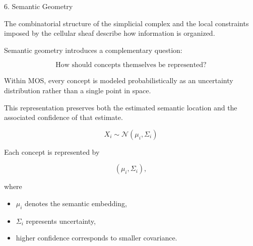 %
%

\begin{mosbox}{6. Semantic Geometry}

\BodyFont

The combinatorial structure of the simplicial complex and the local
constraints imposed by the cellular sheaf describe how information is
organized.

Semantic geometry introduces a complementary question:

\[
\boxed{
\text{How should concepts themselves be represented?}
}
\]

Within MOS, every concept is modeled probabilistically as an uncertainty
distribution rather than a single point in space.

This representation preserves both the estimated semantic location and the
associated confidence of that estimate.

\end{mosbox}


\begin{eqbox}

\[
\boxed{
X_i
\sim
\mathcal N(\mu_i,\Sigma_i)
}
\]

\BodyFont

Each concept is represented by

\[
(\mu_i,\Sigma_i),
\]

where

\begin{itemize}

\item $\mu_i$ denotes the semantic embedding,

\item $\Sigma_i$ represents uncertainty,

\item higher confidence corresponds to smaller covariance.

\end{itemize}

\end{eqbox}


